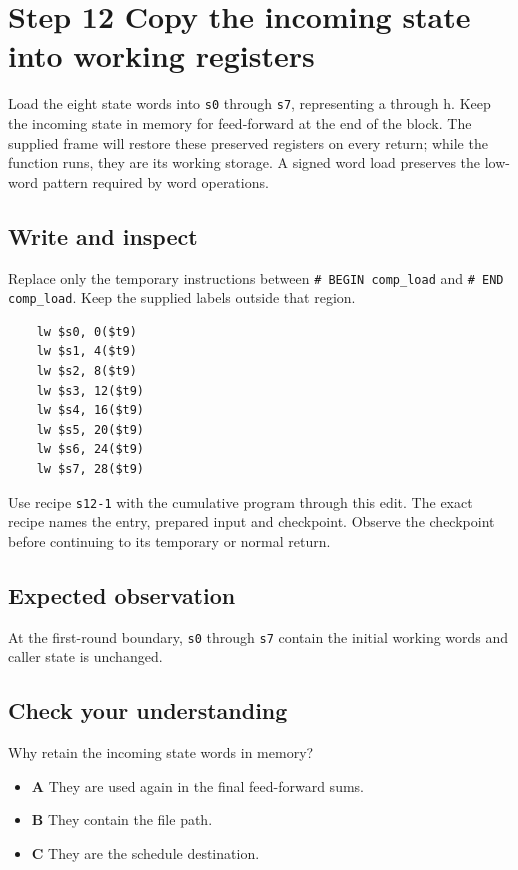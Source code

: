 \section{Step 12 Copy the incoming state into working registers}\label{sha-s12}

Load the eight state words into \texttt{s0} through \texttt{s7}, representing a through h. Keep the incoming state in memory for feed-forward at the end of the block. The supplied frame will restore these preserved registers on every return; while the function runs, they are its working storage. A signed word load preserves the low-word pattern required by word operations.

\subsection{Write and inspect}
Replace only the temporary instructions between \texttt{\# BEGIN comp\_load} and \texttt{\# END comp\_load}. Keep the supplied labels outside that region.

\begin{verbatim}
    lw $s0, 0($t9)
    lw $s1, 4($t9)
    lw $s2, 8($t9)
    lw $s3, 12($t9)
    lw $s4, 16($t9)
    lw $s5, 20($t9)
    lw $s6, 24($t9)
    lw $s7, 28($t9)
\end{verbatim}

Use recipe \texttt{s12-1} with the cumulative program through this edit. The exact recipe names the entry, prepared input and checkpoint. Observe the checkpoint before continuing to its temporary or normal return.

\subsection{Expected observation}
At the first-round boundary, \texttt{s0} through \texttt{s7} contain the initial working words and caller state is unchanged.

\subsection{Check your understanding}
Why retain the incoming state words in memory?

\begin{itemize}
  \item \textbf{A} They are used again in the final feed-forward sums.
  \item \textbf{B} They contain the file path.
  \item \textbf{C} They are the schedule destination.
\end{itemize}

